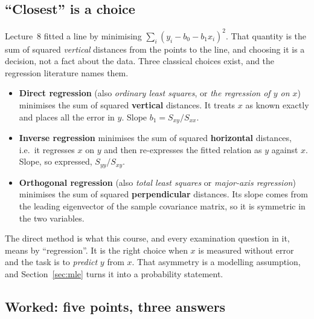\documentclass[11pt]{article}
\begin{document}
\subsection{``Closest'' is a choice}

Lecture~8 fitted a line by minimising $\sum_i (y_i - b_0 - b_1 x_i)^2$. That
quantity is the sum of squared \emph{vertical} distances from the points to
the line, and choosing it is a decision, not a fact about the data. Three
classical choices exist, and the regression literature names them.

\begin{itemize}[leftmargin=*]
  \item \textbf{Direct regression} (also \emph{ordinary least squares}, or
    \emph{the regression of $y$ on $x$}) minimises the sum of squared
    \textbf{vertical} distances. It treats $x$ as known exactly and places all
    the error in $y$. Slope $b_1 = S_{xy}/S_{xx}$.
  \item \textbf{Inverse regression} minimises the sum of squared
    \textbf{horizontal} distances, i.e.\ it regresses $x$ on $y$ and then
    re-expresses the fitted relation as $y$ against $x$. Slope, so expressed,
    $S_{yy}/S_{xy}$.
  \item \textbf{Orthogonal regression} (also \emph{total least squares} or
    \emph{major-axis regression}) minimises the sum of squared
    \textbf{perpendicular} distances. Its slope comes from the leading
    eigenvector of the sample covariance matrix, so it is symmetric in the two
    variables.
\end{itemize}

\begin{keyidea}
The direct method is what this course, and every examination question in it,
means by ``regression''. It is the right choice when $x$ is measured without
error and the task is to \emph{predict} $y$ from $x$. That asymmetry is a
modelling assumption, and Section~\ref{sec:mle} turns it into a probability
statement.
\end{keyidea}

\subsection{Worked: five points, three answers}
\label{sec:fivepoints}
\end{document}
